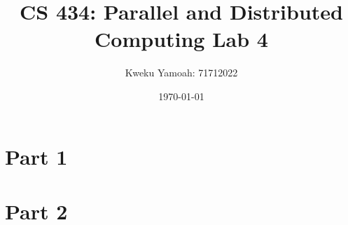\documentclass[12pt, a4paper, fleqn, titlepage]{article}
\title{\textbf{CS 434: Parallel and Distributed Computing Lab 4}}
\author{Kweku Yamoah: 71712022}
\date{\today}
\begin{document}
\maketitle

\section*{Part 1}

\section*{Part 2}
\end{document}
